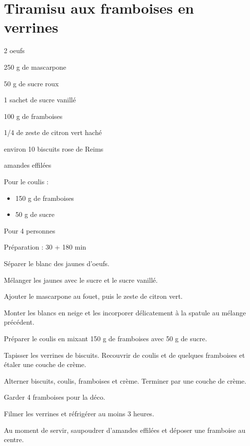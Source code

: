 \section[\normalsize{Tiramisu aux framboises en verrines}]{Tiramisu aux framboises en verrines}

\begin{ingredients}
\item 2 oeufs
\item 250 g de mascarpone
\item 50 g de sucre roux
\item 1 sachet de sucre vanill\'e
\item 100 g de framboises
\item 1/4 de zeste de citron vert hach\'e
\item environ 10 biscuits rose de Reims
\item amandes effil\'ees
\item Pour le coulis :
\begin{itemize}
\item 150 g de framboises
\item 50 g de sucre
\end{itemize}
\end{ingredients}
\begin{infos}
\item Pour 4 personnes
\item Préparation : 30 + 180 min
\end{infos}
\begin{etapes}
\item S\'eparer le blanc des jaunes d’oeufs. 
\item M\'elanger les jaunes avec le sucre et le sucre vanill\'e. 
\item Ajouter le mascarpone au fouet, puis le zeste de citron vert. 
\item Monter les blancs en neige et les incorporer d\'elicatement \`a la spatule au m\'elange pr\'ec\'edent.
\item Pr\'eparer le coulis en mixant 150 g de framboises avec 50 g de sucre.
\item Tapisser les verrines de biscuits. Recouvrir de coulis et de quelques framboises et \'etaler une couche de cr\`eme.
\item Alterner biscuits, coulis, framboises et cr\`eme. Terminer par une couche de cr\`eme. 
\item Garder 4 framboises pour la d\'eco.
\item Filmer les verrines et r\'efrig\'erer au moins 3 heures.
\item Au moment de servir, saupoudrer d’amandes effil\'ees et d\'eposer une framboise au centre.
\end{etapes}
\begin{conseils}
\end{conseils}
